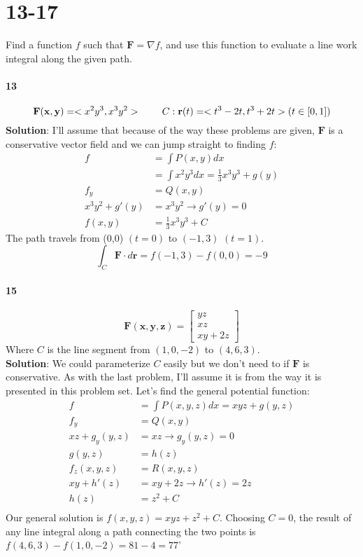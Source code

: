 \documentclass{article}
\begin{document}
    \section*{13-17} Find a function $f$ such that $\mathbf{F} = \nabla f$, and use this function to evaluate a line
    work integral along the given path.

    \paragraph{13}
    \[\mathbf{F(x,y)}=<x^{2}y^{3}, x^{3}y^{2}> \hspace{0.3in} C: \mathbf{r}(t) = <t^3-2t, t^3+2t> (t\in [0,1])\]
    \textbf{Solution}: I'll assume that because of the way these problems are given, $\mathbf{F}$ is a conservative vector field and
    we can jump straight to finding $f$:
    \begin{align*}
        f &= \int P(x,y) dx \\
        &= \int x^{2}y^{3}dx = \frac{1}{3}x^{3}y^{3} + g(y) \\
        f_y &= Q(x,y)\\
        x^{3}y^{2} + g'(y) &= x^{3}y^{2} \rightarrow g'(y) = 0\\
        f(x,y) &= \frac{1}{3}x^{3}y^{3} + C
    \end{align*}
    The path travels from (0,0) $(t=0)$ to $(-1,3)$ $(t=1)$.
    \[\int_C \mathbf{F\cdot}d\mathbf{r} = f(-1,3)-f(0,0) = -9\]

    \paragraph{15}
    \[
        \mathbf{F(x,y,z)} = \begin{bmatrix} yz \\ xz \\ xy+2z \end{bmatrix}
    \]
    Where $C$ is the line segment from $(1,0,-2)$ to $(4,6,3)$.\\
    \textbf{Solution}: We could parameterize $C$ easily but we don't need to if $\mathbf{F}$ is conservative. As with
    the last problem, I'll assume it is from the way it is presented in this problem set. Let's find the general potential function:
    \begin{align*}
        f &= \int P(x,y,z)dx = xyz + g(y,z) \\
        f_y &= Q(x,y) \\
        xz + g_y(y,z) &= xz \rightarrow g_y(y,z) = 0 \\
        g(y,z) &= h(z)\\
        f_z(x,y,z) &= R(x,y,z)\\
        xy + h'(z) &= xy + 2z \rightarrow h'(z) = 2z \\
        h(z) &= z^2 + C\\
    \end{align*}
    Our general solution is $f(x,y,z) = xyz + z^2 + C$. Choosing $C=0$, the result of any line integral along a path connecting the
    two points is $f(4,6,3)-f(1,0,-2)=81-4=77$'
\end{document}
